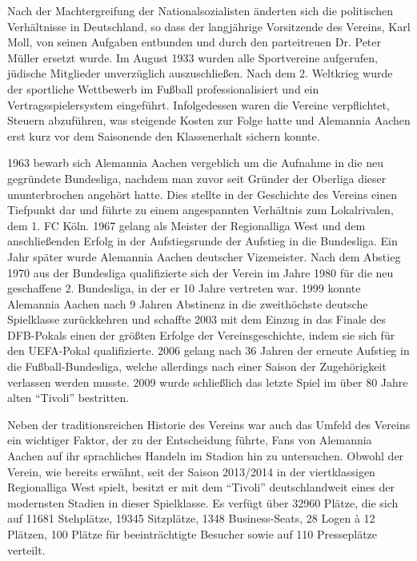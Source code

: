 Nach der Machtergreifung der Nationalsozialisten änderten sich die politischen Verhältnisse in Deutschland, so dass der langjährige Vorsitzende des Vereins, Karl Moll, von seinen Aufgaben entbunden und durch den parteitreuen Dr. Peter Müller ersetzt wurde.
Im August 1933 wurden alle Sportvereine aufgerufen, jüdische Mitglieder unverzüglich auszuschließen.
Nach dem 2. Weltkrieg wurde der sportliche Wettbewerb im Fußball professionalisiert und ein Vertragsspielersystem eingeführt.
Infolgedessen waren die Vereine verpflichtet, Steuern abzuführen, was steigende Kosten zur Folge hatte und Alemannia Aachen erst kurz vor dem Saisonende den Klassenerhalt sichern konnte.

1963 bewarb sich Alemannia Aachen vergeblich um die Aufnahme in die neu gegründete Bundesliga, nachdem man zuvor seit Gründer der Oberliga dieser ununterbrochen angehört hatte.
Dies stellte in der Geschichte des Vereins einen Tiefpunkt dar und führte zu einem angespannten Verhältnis zum Lokalrivalen, dem 1. FC Köln.
1967 gelang als Meister der Regionalliga West und dem anschließenden Erfolg in der Aufstiegsrunde der Aufstieg in die Bundesliga.
Ein Jahr später wurde Alemannia Aachen deutscher Vizemeister.
Nach dem Abstieg 1970 aus der Bundesliga qualifizierte sich der Verein im Jahre 1980 für die neu geschaffene 2. Bundesliga, in der er 10 Jahre vertreten war.
1999 konnte Alemannia Aachen nach 9 Jahren Abstinenz in die zweithöchste deutsche Spielklasse zurückkehren und schaffte 2003 mit dem Einzug in das Finale des DFB-Pokals einen der größten Erfolge der Vereinsgeschichte, indem sie sich für den UEFA-Pokal qualifizierte.
2006 gelang nach 36 Jahren der erneute Aufstieg in die Fußball-Bundesliga, welche allerdings nach einer Saison der Zugehörigkeit verlassen werden musste.
2009 wurde schließlich das letzte Spiel im über 80 Jahre alten "`Tivoli"' bestritten.

Neben der traditionsreichen Historie des Vereins war auch das Umfeld des Vereins ein wichtiger Faktor, der zu der Entscheidung führte, Fans von Alemannia Aachen auf ihr sprachliches Handeln im Stadion hin zu untersuchen.
Obwohl der Verein, wie bereits erwähnt, seit der Saison 2013/2014 in der viertklassigen Regionalliga West spielt, besitzt er mit dem "`Tivoli"' deutschlandweit eines der modernsten Stadien in dieser Spielklasse.
Es verfügt über 32960 Plätze, die sich auf 11681 Stehplätze, 19345 Sitzplätze, 1348 Business-Seats, 28 Logen à 12 Plätzen, 100 Plätze für beeinträchtigte Besucher sowie auf 110 Presseplätze verteilt.

